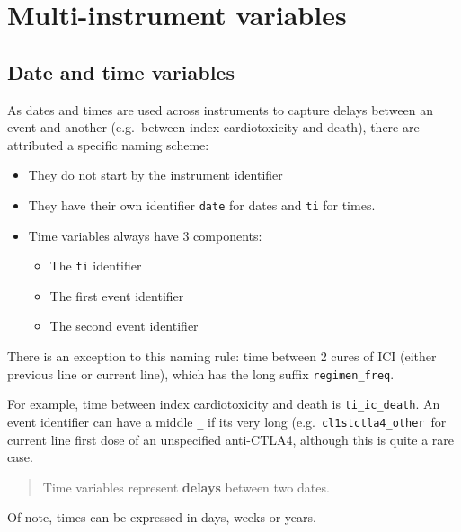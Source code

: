 \documentclass[
]{book}
\begin{document}
\hypertarget{multi_instrument_var}{%
\chapter{Multi-instrument variables}\label{multi_instrument_var}}

\hypertarget{date-and-time-variables}{%
\section{Date and time variables}\label{date-and-time-variables}}

As dates and times are used across instruments to capture delays between an event and another (e.g.~between index cardiotoxicity and death), there are attributed a specific naming scheme:

\begin{itemize}
\item
  They do not start by the instrument identifier
\item
  They have their own identifier \texttt{date} for dates and \texttt{ti} for times.
\item
  Time variables always have 3 components:

  \begin{itemize}
  \item
    The \texttt{ti} identifier
  \item
    The first event identifier
  \item
    The second event identifier
  \end{itemize}
\end{itemize}

There is an exception to this naming rule: time between 2 cures of ICI (either previous line or current line), which has the long suffix \texttt{regimen\_freq}.

For example, time between index cardiotoxicity and death is \texttt{ti\_ic\_death}. An event identifier can have a middle \texttt{\_} if its very long (e.g.~\texttt{cl1stctla4\_other}~for current line first dose of an unspecified anti-CTLA4, although this is quite a rare case.

\begin{quote}
Time variables represent \textbf{delays} between two dates.
\end{quote}

Of note, times can be expressed in days, weeks or years.
\end{document}
